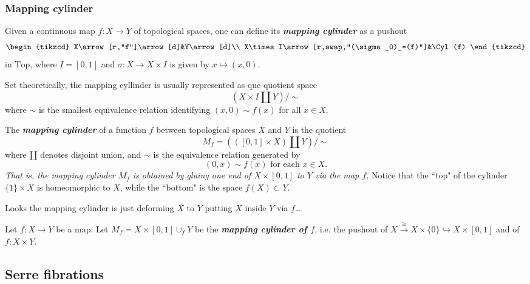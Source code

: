 \begin{remark}
\subsubsection{Mapping cylinder}

\begin{definition}
	Given a continuous map $f:X\to Y$ of topological spaces, one can define its \textbf{\textit{mapping cylinder}} as a pushout
	$$\begin{tikzcd}
		X\arrow[r,"f"]\arrow[d]&Y\arrow[d]\\
		X\times I\arrow[r,swap,"(\sigma_0)_*(f)"]&\Cyl(f)
	\end{tikzcd}$$
	in $\text{Top}$, where $I=[0,1]$ and $\sigma:X\to X\times I$ is given by $x\mapsto(x,0)$.
	
	Set theoretically, the mapping cyllinder is usually represented as que quotient space
	$$\left(X\times I\coprod Y\right)\Big/\sim$$
	where $\sim$ is the smallest equivalence relation identifying $(x,0)\sim f(x)$ for all $x\in X$.
\end{definition}

\begin{definition}
The \textbf{\textit{mapping cylinder}} of a function $f$ between topological spaces $X$ and $Y$ is the quotient
$$M_f=(([0,1]\times X)\amalg Y)\big/\sim$$
where $\amalg$ denotes disjoint union, and $\sim$ is the equivalence relation generated by
$$(0,x)\sim f(x)\text{ for each }x\in X.$$
{\it That is, the mapping cylinder $M_f$ is obtained by gluing one end of $X\times[0,1]$ to $Y$ via the map $f$.} Notice that the ``top" of the cylinder $\{1\}\times X$ is homeomorphic to $X$, while the ``bottom" is the space $f(X)\subset Y$.
	
{\color{persiangreen}Looks the mapping cylinder is just deforming $X$ to $Y$ putting $X$ inside $Y$ via $f$…}
\end{definition}

\begin{definition}
	Let $f:X\to Y$ be a map. Let $M_f=X\times[0,1]\cup_fY$ be the \textbf{\textit{mapping cylinder of $f$}}, i.e. the pushout of $X\overset{\cong}{\to}X\times\{0\}\hookrightarrow X\times[0,1]$ and of $f:X\times Y$.
\end{definition}

\subsection{Serre fibrations}


\end{remark}
